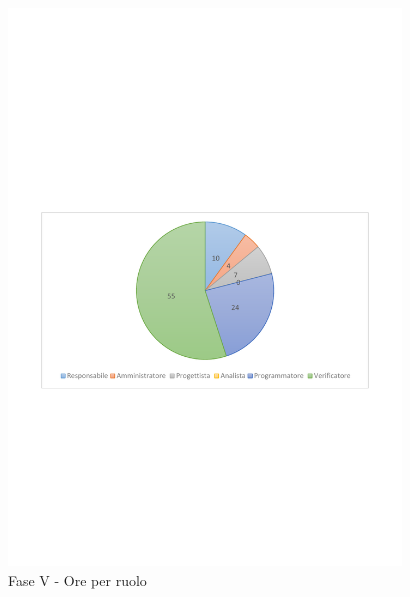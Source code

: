 \documentclass[../PianoProgetto.tex]{subfiles}
\begin{document}
	\begin{figure}[!h]
		\centering
		\includegraphics[width=0.93\textwidth , trim=2cm 9.5cm 2cm 11cm]{grafici/V/V-ore-ruolo}
			\caption{Fase V - Ore per ruolo}
		\label{fig:CircleChart-faseV_ore_r}
	\end{figure}
\vfill	
\newpage
\end{document}
